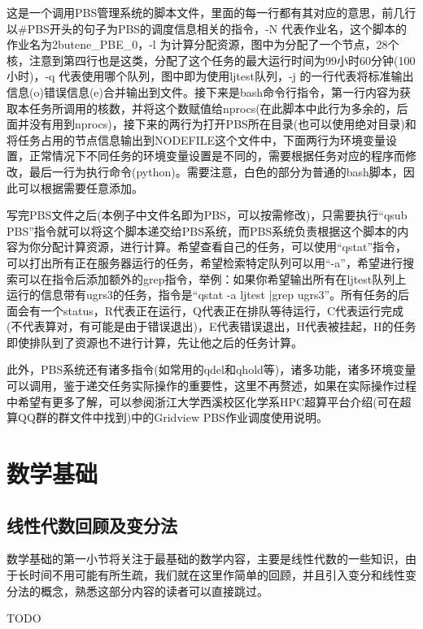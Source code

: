 \documentclass{article}
\numberwithin{equation}{section}
\begin{document}
    这是一个调用PBS管理系统的脚本文件，里面的每一行都有其对应的意思，前几行以\#PBS开头的句子为PBS的调度信息相关的指令，-N 代表作业名，这个脚本的作业名为2butene\_PBE\_0，-l 为计算分配资源，图中为分配了一个节点，28个核，注意到第四行也是这类，分配了这个任务的最大运行时间为99小时60分钟(100小时)，-q 代表使用哪个队列，图中即为使用ljtest队列，-j 的一行代表将标准输出信息(o)错误信息(e)合并输出到文件。接下来是bash命令行指令，第一行内容为获取本任务所调用的核数，并将这个数赋值给nprocs(在此脚本中此行为多余的，后面并没有用到nprocs)，接下来的两行为打开PBS所在目录(也可以使用绝对目录)和将任务占用的节点信息输出到NODEFILE这个文件中，下面两行为环境变量设置，正常情况下不同任务的环境变量设置是不同的，需要根据任务对应的程序而修改，最后一行为执行命令(python)。需要注意，白色的部分为普通的bash脚本，因此可以根据需要任意添加。

    写完PBS文件之后(本例子中文件名即为PBS，可以按需修改)，只需要执行“qsub PBS”指令就可以将这个脚本递交给PBS系统，而PBS系统负责根据这个脚本的内容为你分配计算资源，进行计算。希望查看自己的任务，可以使用“qstat”指令，可以打出所有正在服务器运行的任务，希望检索特定队列可以用“-a”，希望进行搜索可以在指令后添加额外的grep指令，举例：如果你希望输出所有在ljtest队列上运行的信息带有ugrs3的任务，指令是“qstat -a ljtest |grep ugrs3”。所有任务的后面会有一个status，R代表正在运行，Q代表正在排队等待运行，C代表运行完成(不代表算对，有可能是由于错误退出)，E代表错误退出，H代表被挂起，H的任务即使排队到了资源也不进行计算，先让他之后的任务计算。

    此外，PBS系统还有诸多指令(如常用的qdel和qhold等)，诸多功能，诸多环境变量可以调用，鉴于递交任务实际操作的重要性，这里不再赘述，如果在实际操作过程中希望有更多了解，可以参阅浙江大学西溪校区化学系HPC超算平台介绍(可在超算QQ群的群文件中找到)中的Gridview PBS作业调度使用说明。
    
    \section{数学基础}
    \subsection{线性代数回顾及变分法}
    数学基础的第一小节将关注于最基础的数学内容，主要是线性代数的一些知识，由于长时间不用可能有所生疏，我们就在这里作简单的回顾，并且引入变分和线性变分法的概念，熟悉这部分内容的读者可以直接跳过。

    TODO
\end{document}
